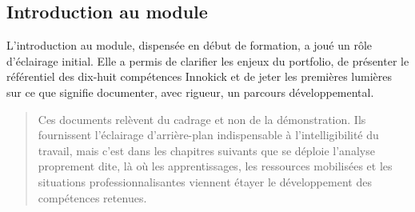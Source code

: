 \subsection*{Introduction au module}

L'introduction au module, dispensée en début de formation, a joué un rôle d'éclairage initial. Elle a permis de clarifier les enjeux du portfolio, de présenter le référentiel des dix-huit compétences Innokick et de jeter les premières lumières sur ce que signifie documenter, avec rigueur, un parcours développemental.

\begin{quote}
Ces documents relèvent du cadrage et non de la démonstration. Ils fournissent l'éclairage d'arrière-plan indispensable à l'intelligibilité du travail, mais c'est dans les chapitres suivants que se déploie l'analyse proprement dite, là où les apprentissages, les ressources mobilisées et les situations professionnalisantes viennent étayer le développement des compétences retenues.
\end{quote}


\clearpage
\ClearShipoutPictureBG